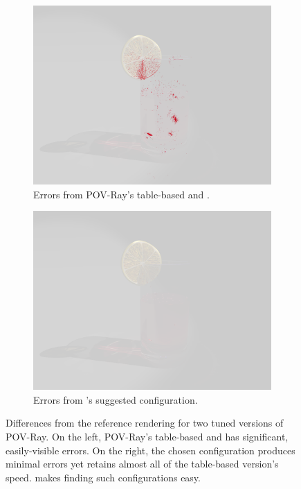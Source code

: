 \documentclass[paper.tex]{subfiles}
\begin{document}
\begin{figure}
  \begin{subfigure}{.31\linewidth}
      \includegraphics[width=\linewidth]{images/double_all_povray_diff.png}
      \caption{Errors from POV-Ray's table-based  and .}
  \end{subfigure}%
  \hfill%
  \begin{subfigure}{.31\linewidth}
      \includegraphics[width=\linewidth]{images/double_optuner_77_diff.png}
      \caption{Errors from \name's suggested configuration.}
  \end{subfigure}%
  \hfill%
  \begin{minipage}{.31\linewidth}
  \caption{
      Differences from the reference rendering
        for two tuned versions of POV-Ray.
      On the left, POV-Ray's table-based  and 
        has significant, easily-visible errors.
      On the right, the chosen \name configuration
        produces minimal errors yet retains
        almost all of the table-based version's speed.
      \name makes finding such configurations easy.
  }
  \label{fig:grenadine-compare}
  \end{minipage}
\end{figure}
\end{document}

